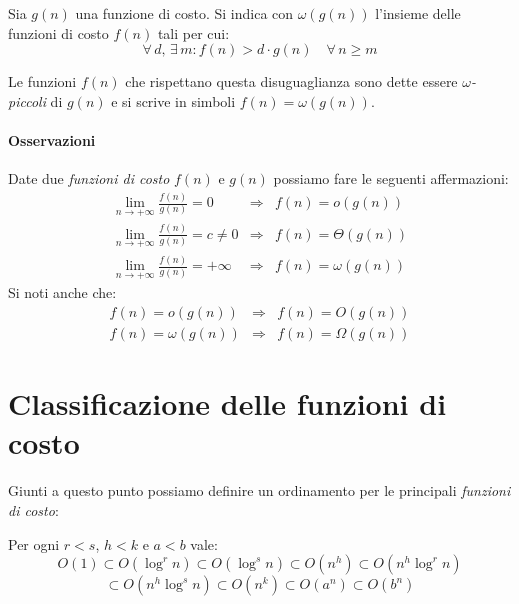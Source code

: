 \begin{definition}
    Sia $g(n)$ una funzione di costo. Si indica con $\omega(g(n))$ l'insieme
    delle funzioni di costo $f(n)$ tali per cui:
    \[\forall\,d,\,\exists\,m:f(n)>d\cdot g(n)\quad\forall\,n\geq m\]
\end{definition}\noindent
Le funzioni $f(n)$ che rispettano questa disuguaglianza sono dette essere
\emph{$\omega$-piccoli} di $g(n)$ e si scrive in simboli $f(n)=\omega(g(n))$.

\paragraph{Osservazioni}
Date due \emph{funzioni di costo} $f(n)$ e $g(n)$ possiamo fare le seguenti
affermazioni:
\[\renewcommand{\arraystretch}{1.3} 
\begin{array}{rcl}
    \lim\limits_{n\to+\infty}\frac{f(n)}{g(n)}=0 & \Rightarrow & f(n)=o(g(n))\\
    \lim\limits_{n\to+\infty}\frac{f(n)}{g(n)}=c\neq0 & \Rightarrow & f(n)=\Theta(g(n))\\
    \lim\limits_{n\to+\infty}\frac{f(n)}{g(n)}=+\infty & \Rightarrow & f(n)=\omega(g(n))
\end{array}\]
Si noti anche che:
\[\begin{array}{rcl}
    f(n)=o(g(n)) & \Rightarrow & f(n)=O(g(n))\\
    f(n)=\omega(g(n)) & \Rightarrow & f(n)=\Omega(g(n))
\end{array}\]

\section{Classificazione delle funzioni di costo}
Giunti a questo punto possiamo definire un ordinamento per le principali
\emph{funzioni di costo}:

\begin{definition}
    Per ogni $r<s$, $h<k$ e $a<b$ vale:
    \[O(1)\subset O(\log^rn)\subset O(\log^sn)\subset O(n^h)\subset
    O(n^h\log^rn)\]
    \[\subset O(n^h\log^sn)\subset O(n^k)\subset O(a^n)\subset O(b^n)\]
\end{definition}